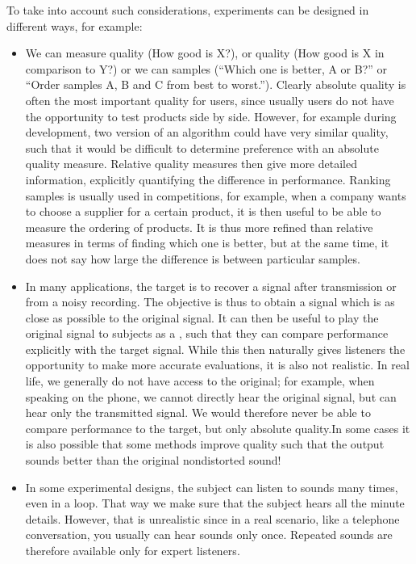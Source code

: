 \documentclass[letterpaper,10pt,english]{jupyterBook}
\begin{document}
\sphinxAtStartPar
To take into account such considerations, experiments can be designed in
different ways, for example:
\begin{itemize}
\item {} 
\sphinxAtStartPar
We can measure  quality (How good is X?), or 
quality (How good is X in comparison to Y?) or we can  samples
(“Which one is better, A or B?” or “Order samples A, B and C from
best to worst.”). Clearly absolute quality is often the most
important quality for users, since usually users do not have the
opportunity to test products side by side. However, for example
during development, two version of an algorithm could have very
similar quality, such that it would be difficult to determine
preference with an absolute quality measure. Relative quality
measures then give more detailed information, explicitly quantifying
the difference in performance. Ranking samples is usually used in
competitions, for example, when a company wants to choose a supplier
for a certain product, it is then useful to be able to measure the
ordering of products. It is thus more refined than relative measures
in terms of finding which one is better, but at the same time, it
does not say how large the difference is between particular samples.

\item {} 
\sphinxAtStartPar
In many applications, the target is to recover a signal after
transmission or from a noisy recording. The objective is thus to
obtain a signal which is as close as possible to the original
signal. It can then be useful to play the original signal to
subjects as a , such that they can compare performance
explicitly with the target signal. While this then naturally gives
listeners the opportunity to make more accurate evaluations, it is
also not realistic. In real life, we generally do not have access to
the original; for example, when speaking on the phone, we cannot
directly hear the original signal, but can hear only the transmitted
signal. We would therefore never be able to compare performance to
the target, but only absolute quality.In some cases it is also possible that some  methods improve quality such that
the output sounds better than the original non\sphinxhyphen{}distorted sound!

\item {} 
\sphinxAtStartPar
In some experimental designs, the subject can listen to sounds many
times, even in a loop. That way we make sure that the subject hears
all the minute details. However, that is unrealistic since in a real
scenario, like a telephone conversation, you usually can hear sounds
only once. Repeated sounds are therefore available only for expert
listeners.


\end{itemize}
\end{document}
